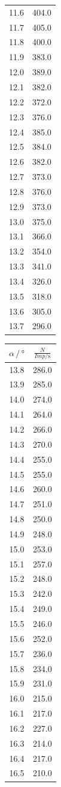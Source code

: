 \begin{table}
\begin{tabular}[t]{cc}
  11.6 & 404.0\\
  11.7 & 405.0\\
  11.8 & 400.0\\
  11.9 & 383.0\\
  12.0 & 389.0\\
  12.1 & 382.0\\
  12.2 & 372.0\\
  12.3 & 376.0\\
  12.4 & 385.0\\
  12.5 & 384.0\\
  12.6 & 382.0\\
  12.7 & 373.0\\
  12.8 & 376.0\\
  12.9 & 373.0\\
  13.0 & 375.0\\
  13.1 & 366.0\\
  13.2 & 354.0\\
  13.3 & 341.0\\
  13.4 & 326.0\\
  13.5 & 318.0\\
  13.6 & 305.0\\
  13.7 & 296.0  \\
  \bottomrule
  \end{tabular}
  \begin{tabular}[t]{cc}
  \toprule
  $\alpha \,/\, \si{\degree} $ & $\frac{N}{Imp/\si{\second}}$ \\
  \midrule
  13.8 & 286.0  \\
  13.9 & 285.0  \\
  14.0 & 274.0  \\
  14.1 & 264.0  \\
  14.2 & 266.0  \\
  14.3 & 270.0  \\
  14.4 & 255.0  \\
  14.5 & 255.0  \\
  14.6 & 260.0  \\
  14.7 & 251.0  \\
  14.8 & 250.0  \\
  14.9 & 248.0  \\
  15.0 & 253.0  \\
  15.1 & 257.0  \\
  15.2 & 248.0  \\
  15.3 & 242.0  \\
  15.4 & 249.0  \\
  15.5 & 246.0  \\
  15.6 & 252.0  \\
  15.7 & 236.0  \\
  15.8 & 234.0  \\
  15.9 & 231.0  \\
  16.0 & 215.0  \\
  16.1 & 217.0  \\
  16.2 & 227.0  \\
  16.3 & 214.0  \\
  16.4 & 217.0  \\
  16.5 & 210.0  \\
  \bottomrule
  \end{tabular}
  \label{tab:emission1}
\end{table}

